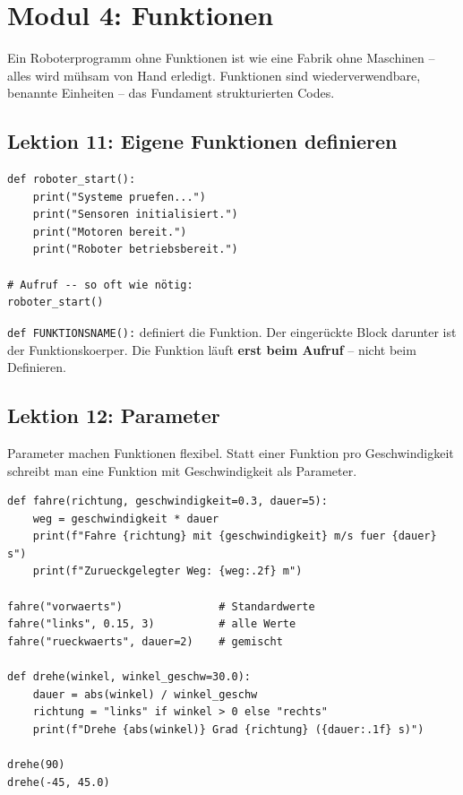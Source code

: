 \chapter{Modul 4: Funktionen}

Ein Roboterprogramm ohne Funktionen ist wie eine Fabrik ohne Maschinen -- alles wird mühsam von Hand erledigt. Funktionen sind wiederverwendbare, benannte Einheiten -- das Fundament strukturierten Codes.

\section{Lektion 11: Eigene Funktionen definieren}

\begin{lstlisting}
def roboter_start():
    print("Systeme pruefen...")
    print("Sensoren initialisiert.")
    print("Motoren bereit.")
    print("Roboter betriebsbereit.")

# Aufruf -- so oft wie nötig:
roboter_start()
\end{lstlisting}

\begin{merksatz}
\texttt{def FUNKTIONSNAME():} definiert die Funktion. Der eingerückte Block darunter ist der Funktionskoerper. Die Funktion läuft \textbf{erst beim Aufruf} -- nicht beim Definieren.
\end{merksatz}

\section{Lektion 12: Parameter}

Parameter machen Funktionen flexibel. Statt einer Funktion pro Geschwindigkeit schreibt man eine Funktion mit Geschwindigkeit als Parameter.

\begin{lstlisting}
def fahre(richtung, geschwindigkeit=0.3, dauer=5):
    weg = geschwindigkeit * dauer
    print(f"Fahre {richtung} mit {geschwindigkeit} m/s fuer {dauer} s")
    print(f"Zurueckgelegter Weg: {weg:.2f} m")

fahre("vorwaerts")               # Standardwerte
fahre("links", 0.15, 3)          # alle Werte
fahre("rueckwaerts", dauer=2)    # gemischt

def drehe(winkel, winkel_geschw=30.0):
    dauer = abs(winkel) / winkel_geschw
    richtung = "links" if winkel > 0 else "rechts"
    print(f"Drehe {abs(winkel)} Grad {richtung} ({dauer:.1f} s)")

drehe(90)
drehe(-45, 45.0)
\end{lstlisting}

